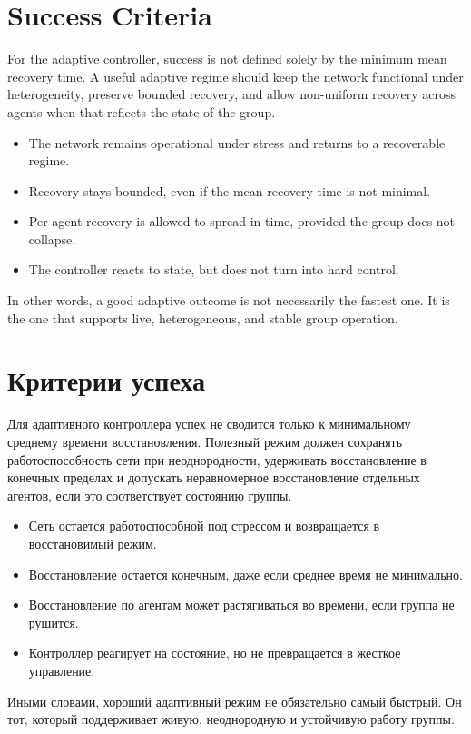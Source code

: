 \section{Success Criteria}
For the adaptive controller, success is not defined solely by the minimum mean recovery time. A useful adaptive regime should keep the network functional under heterogeneity, preserve bounded recovery, and allow non-uniform recovery across agents when that reflects the state of the group.

\begin{itemize}
    \item The network remains operational under stress and returns to a recoverable regime.
    \item Recovery stays bounded, even if the mean recovery time is not minimal.
    \item Per-agent recovery is allowed to spread in time, provided the group does not collapse.
    \item The controller reacts to state, but does not turn into hard control.
\end{itemize}

In other words, a good adaptive outcome is not necessarily the fastest one. It is the one that supports live, heterogeneous, and stable group operation.

\section{Критерии успеха}
Для адаптивного контроллера успех не сводится только к минимальному среднему времени восстановления. Полезный режим должен сохранять работоспособность сети при неоднородности, удерживать восстановление в конечных пределах и допускать неравномерное восстановление отдельных агентов, если это соответствует состоянию группы.

\begin{itemize}
    \item Сеть остается работоспособной под стрессом и возвращается в восстановимый режим.
    \item Восстановление остается конечным, даже если среднее время не минимально.
    \item Восстановление по агентам может растягиваться во времени, если группа не рушится.
    \item Контроллер реагирует на состояние, но не превращается в жесткое управление.
\end{itemize}

Иными словами, хороший адаптивный режим не обязательно самый быстрый. Он тот, который поддерживает живую, неоднородную и устойчивую работу группы.
